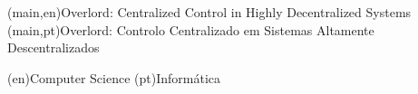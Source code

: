 
%




%
%
%
%
\nttitle(main,en){Overlord: Centralized Control in Highly Decentralized Systems}%
\nttitle(main,pt){Overlord: Controlo Centralizado em Sistemas Altamente Descentralizados}%



%
%
%
%
\ntdepartment*(en){Computer Science} %
\ntdepartment*(pt){Informática}   %



